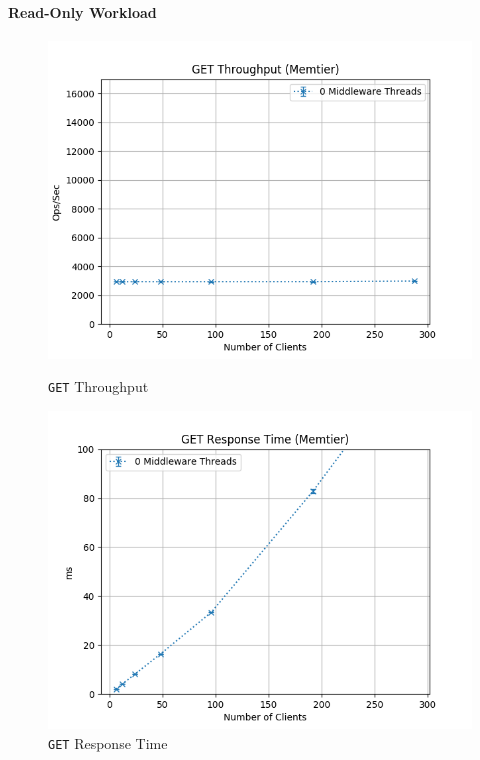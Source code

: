 \documentclass[11pt,a4paper]{article}
\begin{document}
\paragraph{Read-Only Workload}
%
\begin{figure}[H]
    \centering
    \begin{minipage}{0.5\textwidth}
        \centering
        \includegraphics[width=\textwidth]{../illustrations/plots/1_1_one_server/0-1/memtier_get_tp_s.png}
        \caption{\texttt{GET} Throughput}
        \label{fig:one_server_get_tp}
    \end{minipage}\hfill
    \begin{minipage}{0.5\textwidth}
        \centering
        \includegraphics[width=\textwidth]{../illustrations/plots/1_1_one_server/0-1/memtier_get_rt_ms.png}
        \caption{\texttt{GET} Response Time}
        \label{fig:one_server_get_rt}
    \end{minipage}
\end{figure}
\end{document}
